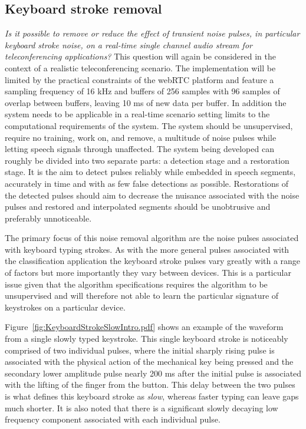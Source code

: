 \subsection{Keyboard stroke removal}
\emph{Is it possible to remove or reduce the effect of transient noise pulses, in particular keyboard stroke noise, on a real-time single channel audio stream for teleconferencing applications?}
This question will again be considered in the context of a realistic teleconferencing scenario. The implementation will be limited by the practical constraints of the webRTC platform and feature a sampling frequency of 16 kHz and buffers of 256 samples with 96 samples of overlap between buffers, leaving 10 ms of new data per buffer. In addition the system needs to be applicable in a real-time scenario setting limits to the computational requirements of the system. The system should be unsupervised, require no training, work on, and remove, a multitude of noise pulses while letting speech signals through unaffected. The system being developed can roughly be divided into two separate parts: a detection stage and a restoration stage. It is the aim to detect pulses reliably while embedded in speech segments, accurately in time and with as few false detections as possible. Restorations of the detected pulses should aim to decrease the nuisance associated with the noise pulses and restored and interpolated segments should be unobtrusive and preferably unnoticeable.

The primary focus of this noise removal algorithm are the noise pulses associated with keyboard typing strokes. As with the more general pulses associated with the classification application the keyboard stroke pulses vary greatly with a range of factors but more importantly they vary between devices. This is a particular issue given that the algorithm specifications requires the algorithm to be unsupervised and will therefore not able to learn the particular signature of keystrokes on a particular device.

Figure~\ref{fig:KeyboardStrokeSlowIntro.pdf} shows an example of the waveform from a single slowly typed keystroke. This single keyboard stroke is noticeably comprised of two individual pulses, where the initial sharply rising pulse is associated with the physical action of the mechanical key being pressed and the secondary lower amplitude pulse nearly 200 ms after the initial pulse is associated with the lifting of the finger from the button. This delay between the two pulses is what defines this keyboard stroke as \emph{slow}, whereas faster typing can leave gaps much shorter. It is also noted that there is a significant slowly decaying low frequency component associated with each individual pulse.

